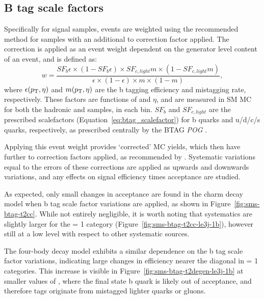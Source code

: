\subsection{B tag scale factors}
Specifically for \FASTSIM signal samples, events are weighted using the
recommended method for \FULLSIM samples with an additional \FULLSIM to \FASTSIM 
correction factor applied. The \FULLSIM correction is applied as an event weight
dependent on the generator level content of an event, and is defined as:
% 
\begin{equation}
w = \frac{SF_b \epsilon \times (1-SF_b \epsilon) \times SF_{c,light} m \times (1
-SF_{c,light} m)}{\epsilon \times (1-\epsilon) \times m \times (1-m)} ,
\label{eq:btag_fullsim_weight}
\end{equation}
% 
where $\epsilon({p_{\text T}}, \eta)$ and $m({p_{\text T}}, \eta)$ are the b tagging efficiency and 
mistagging rate, respectively. These factors are functions of \Pt and $\eta$, and
are measured in SM MC for both the hadronic and \mj samples, in each \HT bin. $SF_b$
and $SF_{c,light}$ are the prescribed scalefactors (Equation~\ref{eq:btag_scalefactor})
for b quarks and u/d/c/s quarks, respectively, as prescribed centrally by the BTAG
\emph{POG} \cite{btagpog-scalefactors}.

Applying this event weight provides `corrected' MC yields, which then 
have further \FASTSIM to \FULLSIM correction factors applied, as recommended by
\cite{btagpogtwiki}.
Systematic variations equal to the errors of these corrections are applied as 
upwards and downwards variations, and any effects on signal efficiency times 
acceptance are studied.

As expected, only small changes in acceptance are found in the charm decay 
model when b tag scale factor variations are applied, as shown in
Figure~\ref{fig:sms-btag-t2cc}. While not entirely negligible, it is worth 
noting that systematics are slightly larger for the \nb= 1 category
(Figure~\ref{fig:sms-btag-t2cc-le3j-1b}), however still at a low level with 
respect to other systematic sources.

The four-body decay model exhibits a similar dependence on the b tag scale
factor variations, indicating large changes in efficiency nearer the diagonal in
\nb = 1 categories. This increase is visible in
Figure~\ref{fig:sms-btag-t2degen-le3j-1b} at smaller values of \deltam, where
the final state b quark is likely out of acceptance, and therefore tags
originate from mistagged lighter quarks or gluons.


